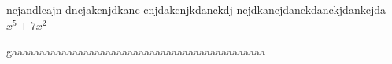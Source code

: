 ncjandlcajn
dncjakcnjdkanc
cnjdakcnjkdanckdj
ncjdkancjdanckdanckjdankcjda
$x^5 + 7x^2$

gaaaaaaaaaaaaaaaaaaaaaaaaaaaaaaaaaaaaaaaaaaaaaa